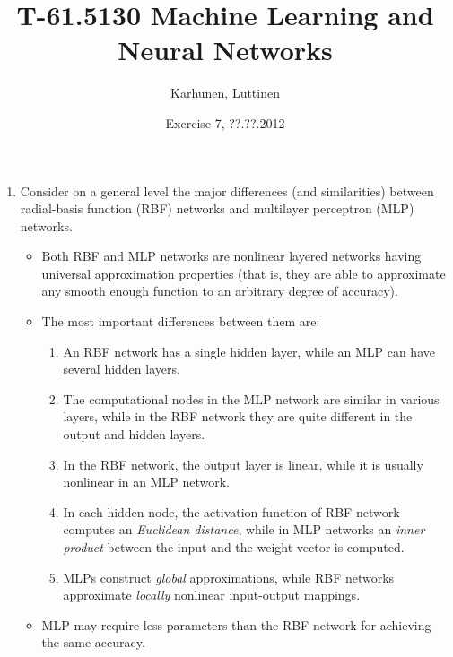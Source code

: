 
\title{T-61.5130 Machine Learning and Neural Networks}
\author{Karhunen, Luttinen}
\date{Exercise 7, ??.??.2012}

\newcommand{\vect}[1]{{\bf{#1}}}
\newcommand{\svect}[1]{\boldsymbol{#1}}
\newcommand{\matr}[1]{\boldsymbol{#1}}




\maketitle

\begin{enumerate}

\item Consider on a general level the major differences (and similarities)
  between radial-basis function (RBF) networks and multilayer perceptron
  (MLP) networks.

  \begin{solution}

    \begin{itemize}
    \item Both RBF and MLP networks are nonlinear layered networks having
      universal approximation properties (that is, they are able to
      approximate any smooth enough function to an arbitrary degree of accuracy).
    \item The most important differences between them are:
      \begin{enumerate}
      \item An RBF network has a single hidden layer, while an MLP can have
        several hidden layers.
      \item The computational nodes in the MLP network are similar in various layers,
        while in the RBF network they are quite different in the output
        and hidden layers.
      \item In the RBF network, the output layer is linear, while it is usually
        nonlinear in an MLP network.
      \item In each hidden node, the activation function of RBF network computes
        an {\em Euclidean distance}, while in MLP networks an {\em inner product}
        between the input and the weight vector is computed.
      \item MLPs construct {\em global} approximations, while RBF networks
        approximate {\em locally} nonlinear input-output mappings.
      \end{enumerate}
    \item MLP may require less parameters than the RBF network for achieving
      the same accuracy.
    \end{itemize}


\end{solution}
\end{enumerate}
